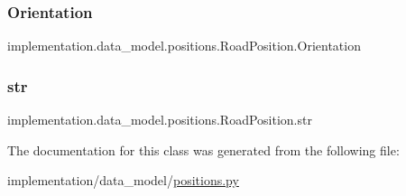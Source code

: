 \subsubsection{\texorpdfstring{Orientation}{Orientation}}
{\footnotesize\ttfamily implementation.\+data\+\_\+model.\+positions.\+Road\+Position.\+Orientation\hspace{0.3cm}{\ttfamily [static]}}

\mbox{\label{classimplementation_1_1data__model_1_1positions_1_1_road_position_ae46fee684f5d771c269ad26a7c516536}} 
\subsubsection{\texorpdfstring{str}{str}}
{\footnotesize\ttfamily implementation.\+data\+\_\+model.\+positions.\+Road\+Position.\+str\hspace{0.3cm}{\ttfamily [static]}}



The documentation for this class was generated from the following file\+:\begin{DoxyCompactItemize}
\item 
implementation/data\+\_\+model/\hyperlink{positions_8py}{positions.\+py}\end{DoxyCompactItemize}
